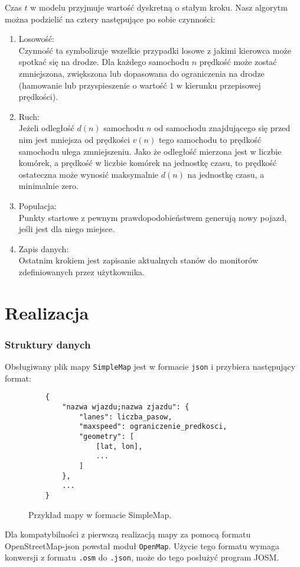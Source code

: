 \documentclass[a4paper,12pt]{article}
\begin{document}
	Czas $t$ w modelu przyjmuje wartość dyskretną o stałym kroku. Nasz algorytm można podzielić na cztery następujące po sobie czynności:

	\begin{enumerate}
		\item Losowość: \\
		Czynność ta symbolizuje wszelkie przypadki losowe z jakimi kierowca może spotkać się na drodze.
		Dla każdego samochodu $n$ prędkość może zostać zmniejszona, zwiększona lub dopasowana do ograniczenia na drodze (hamowanie lub przyspieszenie o wartość $1$ w kierunku przepisowej prędkości).
		
		\item Ruch: \\
		Jeżeli odległość $d(n)$ samochodu $n$ od samochodu znajdującego się przed nim jest mniejsza od prędkości $v(n)$ tego samochodu to prędkość samochodu ulega zmniejszeniu. Jako że odległość mierzona jest w liczbie komórek, a prędkość w liczbie komórek na jednostkę czasu, to prędkość ostateczna może wynosić maksymalnie $d(n)$ na jednostkę czasu, a minimalnie zero.
		
		\item Populacja: \\
		Punkty startowe z pewnym prawdopodobieństwem generują nowy pojazd, jeśli jest dla niego miejsce.
		
		\item Zapis danych: \\
		Ostatnim krokiem jest zapisanie aktualnych stanów do monitorów zdefiniowanych przez użytkownika.
	\end{enumerate}

    \part{Realizacja}
    
    \section{Struktury danych}
    Obsługiwany plik mapy \texttt{SimpleMap} jest w formacie \texttt{json} i przybiera następujący format:
    \begin{center}
	    \begin{figure}[ht]
	    	\begin{lstlisting}
	{
		"nazwa wjazdu;nazwa zjazdu": {
			"lanes": liczba_pasow,
			"maxspeed": ograniczenie_predkosci,
			"geometry": [
				[lat, lon],
				...
			]
		},
		...
	}
	    	\end{lstlisting}
	    	\caption{Przykład mapy w formacie SimpleMap.}
	    \end{figure}
    \end{center}
	Dla kompatybilności z pierwszą realizacją mapy za pomocą formatu OpenStreetMap-json powstał moduł \texttt{OpenMap}. Użycie tego formatu wymaga konwersji z formatu \texttt{.osm} do \texttt{.json}, może do tego posłużyć program JOSM.
    
\end{document}
